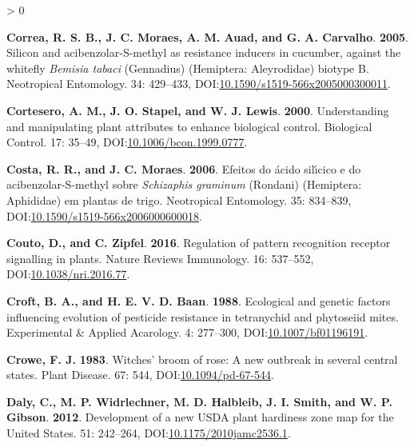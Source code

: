 \documentclass{ufdissertation}[overrideChapters] %
\newlength{\cslhangindent}
\newenvironment{CSLReferences}[2] %
 {%
  \setlength{\parindent}{0pt}
  \ifodd #1 \everypar{\setlength{\hangindent}{\cslhangindent}}\ignorespaces\fi
  \ifnum #2 > 0
  \setlength{\parskip}{#2\baselineskip}
  \fi
 }%
 {}
\begin{document}
{\begin{CSLReferences}{1}{1}
\leavevmode{}%
\textbf{Correa, R. S. B., J. C. Moraes, A. M. Auad, and G. A. Carvalho}. \textbf{2005}. Silicon and acibenzolar-{S}-methyl as resistance inducers in cucumber, against the whitefly {\emph{Bemisia tabaci}} ({Gennadius}) ({Hemiptera}: {Aleyrodidae}) biotype {B}. Neotropical Entomology. 34: 429--433, DOI:\href{https://doi.org/10.1590/s1519-566x2005000300011}{10.1590/s1519-566x2005000300011}.

\leavevmode{}%
\textbf{Cortesero, A. M., J. O. Stapel, and W. J. Lewis}. \textbf{2000}. Understanding and manipulating plant attributes to enhance biological control. Biological Control. 17: 35--49, DOI:\href{https://doi.org/10.1006/bcon.1999.0777}{10.1006/bcon.1999.0777}.

\leavevmode{}%
\textbf{Costa, R. R., and J. C. Moraes}. \textbf{2006}. Efeitos do {á}cido sil{ı́}cico e do acibenzolar-{S}-methyl sobre {\emph{Schizaphis graminum}} ({Rondani}) ({Hemiptera}: {Aphididae}) em plantas de trigo. Neotropical Entomology. 35: 834--839, DOI:\href{https://doi.org/10.1590/s1519-566x2006000600018}{10.1590/s1519-566x2006000600018}.

\leavevmode{}%
\textbf{Couto, D., and C. Zipfel}. \textbf{2016}. Regulation of pattern recognition receptor signalling in plants. Nature Reviews Immunology. 16: 537--552, DOI:\href{https://doi.org/10.1038/nri.2016.77}{10.1038/nri.2016.77}.

\leavevmode{}%
\textbf{Croft, B. A., and H. E. V. D. Baan}. \textbf{1988}. Ecological and genetic factors influencing evolution of pesticide resistance in tetranychid and phytoseiid mites. Experimental {\&} Applied Acarology. 4: 277--300, DOI:\href{https://doi.org/10.1007/bf01196191}{10.1007/bf01196191}.

\leavevmode{}%
\textbf{Crowe, F. J.} \textbf{1983}. Witches' broom of rose: A new outbreak in several central states. Plant Disease. 67: 544, DOI:\href{https://doi.org/10.1094/pd-67-544}{10.1094/pd-67-544}.

\leavevmode{}%
\textbf{Daly, C., M. P. Widrlechner, M. D. Halbleib, J. I. Smith, and W. P. Gibson}. \textbf{2012}. Development of a new {USDA} plant hardiness zone map for the {United} {States}. 51: 242--264, DOI:\href{https://doi.org/10.1175/2010jamc2536.1}{10.1175/2010jamc2536.1}.


\end{CSLReferences}}
\end{document}
